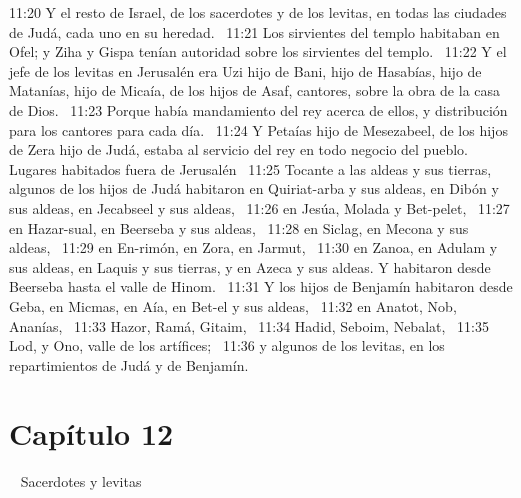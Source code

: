 11:20 Y el resto de Israel, de los sacerdotes y de los levitas, en todas las ciudades de Judá, cada uno en su heredad.  
11:21 Los sirvientes del templo habitaban en Ofel; y Ziha y Gispa tenían autoridad sobre los sirvientes del templo.  
11:22 Y el jefe de los levitas en Jerusalén era Uzi hijo de Bani, hijo de Hasabías, hijo de Matanías, hijo de Micaía, de los hijos de Asaf, cantores, sobre la obra de la casa de Dios.  
11:23 Porque había mandamiento del rey acerca de ellos, y distribución para los cantores para cada día.  
11:24 Y Petaías hijo de Mesezabeel, de los hijos de Zera hijo de Judá, estaba al servicio del rey en todo negocio del pueblo.  
Lugares habitados fuera de Jerusalén  
11:25 Tocante a las aldeas y sus tierras, algunos de los hijos de Judá habitaron en Quiriat-arba y sus aldeas, en Dibón y sus aldeas, en Jecabseel y sus aldeas,  
11:26 en Jesúa, Molada y Bet-pelet,  
11:27 en Hazar-sual, en Beerseba y sus aldeas,  
11:28 en Siclag, en Mecona y sus aldeas,  
11:29 en En-rimón, en Zora, en Jarmut,  
11:30 en Zanoa, en Adulam y sus aldeas, en Laquis y sus tierras, y en Azeca y sus aldeas. Y habitaron desde Beerseba hasta el valle de Hinom.  
11:31 Y los hijos de Benjamín habitaron desde Geba, en Micmas, en Aía, en Bet-el y sus aldeas,  
11:32 en Anatot, Nob, Ananías,  
11:33 Hazor, Ramá, Gitaim,  
11:34 Hadid, Seboim, Nebalat,  
11:35 Lod, y Ono, valle de los artífices;  
11:36 y algunos de los levitas, en los repartimientos de Judá y de Benjamín.  
\section*{Capítulo 12} 
Sacerdotes y levitas  


